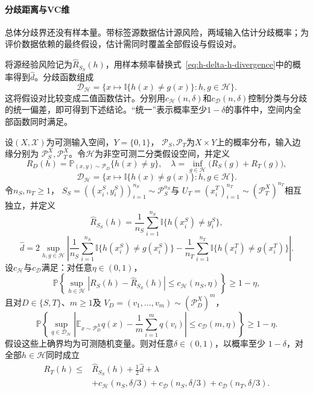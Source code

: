 \paragraph{分歧距离与VC维}

总体分歧界还没有样本量。带标签源数据估计源风险，两域输入估计分歧概率；为评价数据依赖的最终假设，估计需同时覆盖全部假设与假设对。

将源经验风险记为$\widehat R_{S_S}(h)$，用样本频率替换式~\eqref{eq:h-delta-h-divergence}中的概率得到$\widehat d$。分歧函数组成
\[
 \mathcal D_{\mathcal H}
 =\{x\mapsto\mathbb I\{h(x)\neq g(x)\}:h,g\in\mathcal H\}.
\]
这将假设对比较变成二值函数估计。分别用$c_{\mathcal H}(n,\delta)$和$c_{\mathcal D}(n,\delta)$控制分类与分歧的统一偏差，即可得到下述结论。“统一”表示概率至少$1-\delta$的事件中，空间内全部函数同时满足。

\begin{theorem}[有限样本的领域自适应期望风险界]
\label{thm:adaptation-finite-sample}
设$(X,\mathcal X)$为可测输入空间，$Y=\{0,1\}$，
$\mathcal P_S,\mathcal P_T$为$X\times Y$上的概率分布，输入边缘分别为
$\mathcal P_S^X,\mathcal P_T^X$。令$\mathcal H$为非空可测二分类假设空间，并定义
\[
 R_D(h)=\mathbb P_{(x,y)\sim\mathcal P_D}\{h(x)\neq y\},
 \quad
 \lambda=\inf_{g\in\mathcal H}\bigl(R_S(g)+R_T(g)\bigr),
\]
\[
 \mathcal D_{\mathcal H}
 =\{x\mapsto\mathbb I\{h(x)\neq g(x)\}:h,g\in\mathcal H\}.
\]
令$n_S,n_T\geq1$，
$S_S=((x_i^S,y_i^S))_{i=1}^{n_S}\sim\mathcal P_S^{n_S}$与
$U_T=(x_i^T)_{i=1}^{n_T}\sim(\mathcal P_T^X)^{n_T}$相互独立，并定义
\[
 \widehat R_{S_S}(h)=\frac1{n_S}\sum_{i=1}^{n_S}
 \mathbb I\{h(x_i^S)\neq y_i^S\},
\]
\[
 \widehat d
 =2\sup_{h,g\in\mathcal H}\left|
 \frac1{n_S}\sum_{i=1}^{n_S}\mathbb I\{h(x_i^S)\neq g(x_i^S)\}
 -\frac1{n_T}\sum_{i=1}^{n_T}\mathbb I\{h(x_i^T)\neq g(x_i^T)\}
 \right|.
\]
设$c_{\mathcal H}$与$c_{\mathcal D}$满足：对任意$\eta\in(0,1)$，
\[
 \mathbb P\left\{\sup_{h\in\mathcal H}
 |R_S(h)-\widehat R_{S_S}(h)|
 \leq c_{\mathcal H}(n_S,\eta)\right\}\geq1-\eta,
\]
且对$D\in\{S,T\}$、$m\geq1$及
$V_D=(v_1,\ldots,v_m)\sim(\mathcal P_D^X)^m$，
\[
 \mathbb P\left\{\sup_{q\in\mathcal D_{\mathcal H}}
 \left|\mathbb E_{x\sim\mathcal P_D^X}q(x)
 -\frac1m\sum_{i=1}^m q(v_i)\right|
 \leq c_{\mathcal D}(m,\eta)\right\}\geq1-\eta.
\]
假设这些上确界均为可测随机变量。则对任意$\delta\in(0,1)$，以概率至少
$1-\delta$，对全部$h\in\mathcal H$同时成立
\begin{equation}
 \begin{aligned}
 R_T(h)\leq{}&\widehat R_{S_S}(h)+\tfrac12\widehat d+\lambda\\
 &+c_{\mathcal H}(n_S,\delta/3)
  +c_{\mathcal D}(n_S,\delta/3)
  +c_{\mathcal D}(n_T,\delta/3).
 \end{aligned}
 \label{eq:adaptation-vc-risk}
\end{equation}
\end{theorem}
